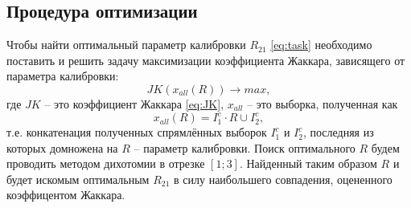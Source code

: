 \subsection{Процедура оптимизации}
Чтобы найти оптимальный параметр калибровки $R_{21}$ \eqref{eq:task} необходимо поставить и решить задачу максимизации коэффициента Жаккара, зависящего от параметра калибровки:
\begin{equation}
	JK(x_{all}(R)) \rightarrow max,
\end{equation}
где $JK$ -- это коэффициент Жаккара \eqref{eq:JK}, $x_{all}$ -- это выборка, полученная как
\begin{equation}
	x_{all}(R) = I_1^c \cdot R \cup I_2^c,
\end{equation}
т.е. конкатенация полученных спрямлённых выборок $I_1^c$ и $I_2^c$, последняя из которых домножена на $R$ -- параметр калибровки. Поиск оптимального $R$ будем проводить методом дихотомии в отрезке $[1;3]$. Найденный таким образом $R$ и будет искомым оптимальным $R_{21}$ в силу наибольшего совпадения, оцененного коэффицентом Жаккара.

\newpage